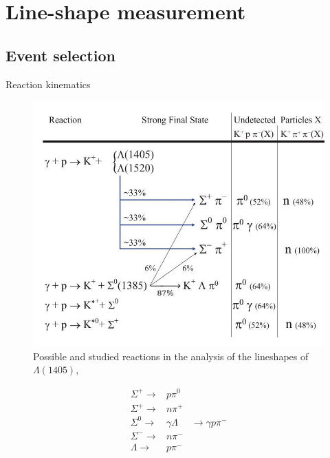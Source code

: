 \documentclass[11pt,aspectratio=1610,dvipsnames]{beamer}
\begin{document}
\section{Line-shape measurement}
\subsection{Event selection}

\begin{frame}{Reaction kinematics}
	\begin{minipage}{.63\linewidth}
		\begin{figure}[H]
			\includegraphics[width=\linewidth]{kinematics}
			\caption*{Possible and studied reactions in the analysis of the lineshapes of $\Lambda(1405)$,  \citet{lineshapes}}
		\end{figure}	
	\end{minipage}
	\begin{minipage}{.34\linewidth}
		\begin{align*}
			\Sigma^+\to &p \pi^0\\
			\Sigma^+\to &n \pi^+\\
			\Sigma^0\to &\gamma\Lambda&\to\gamma p \pi^-\\
			\Sigma^-\to &n \pi^-\\
			\Lambda\to &p \pi^-\\
		\end{align*}
	\end{minipage}
	
\end{frame}
\end{document}
